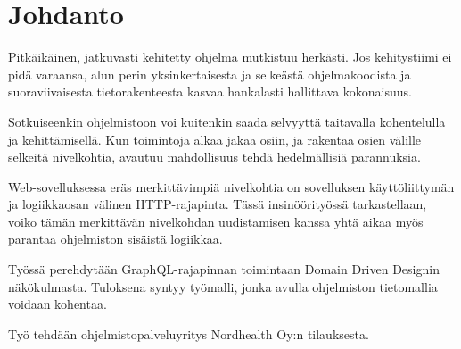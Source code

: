 \hypertarget{johdanto}{%
\chapter{Johdanto}\label{johdanto}}

Pitkäikäinen, jatkuvasti kehitetty ohjelma mutkistuu herkästi. Jos
kehitystiimi ei pidä varaansa, alun perin yksinkertaisesta ja selkeästä
ohjelmakoodista ja suoraviivaisesta tietorakenteesta kasvaa hankalasti
hallittava kokonaisuus.

Sotkuiseenkin ohjelmistoon voi kuitenkin saada selvyyttä taitavalla
kohentelulla ja kehittämisellä. Kun toimintoja alkaa jakaa osiin, ja
rakentaa osien välille selkeitä nivelkohtia, avautuu mahdollisuus tehdä
hedelmällisiä parannuksia.

Web-sovelluksessa eräs merkittävimpiä nivelkohtia on sovelluksen
käyttöliittymän ja logiikkaosan välinen HTTP-rajapinta. Tässä
insinöörityössä tarkastellaan, voiko tämän merkittävän nivelkohdan
uudistamisen kanssa yhtä aikaa myös parantaa ohjelmiston sisäistä
logiikkaa.

Työssä perehdytään GraphQL-rajapinnan toimintaan Domain Driven Designin
näkökulmasta. Tuloksena syntyy työmalli, jonka avulla ohjelmiston
tietomallia voidaan kohentaa.

Työ tehdään ohjelmistopalveluyritys Nordhealth Oy:n tilauksesta.
